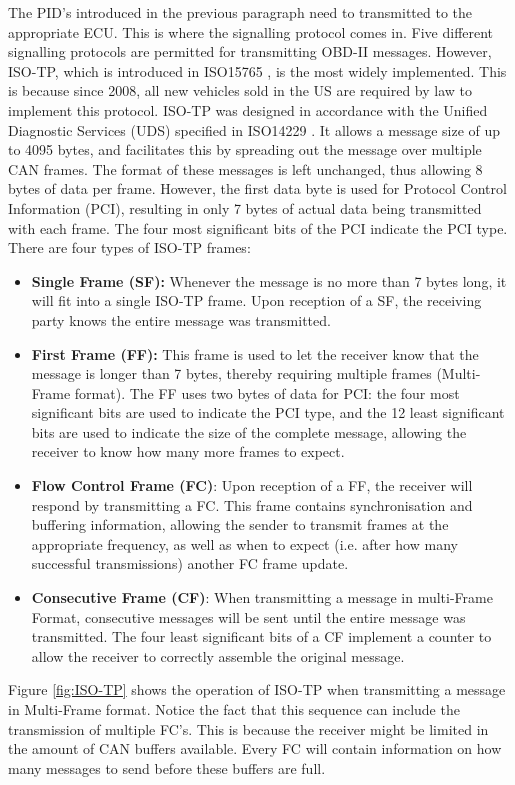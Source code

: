 The PID's introduced in the previous paragraph need to transmitted to the appropriate ECU. This is where the signalling protocol comes in. Five different signalling protocols are permitted for transmitting OBD-II messages. However, ISO-TP, which is introduced in ISO15765 \cite{ISO15765-2:2016}, is the most widely implemented. This is because since 2008, all new vehicles sold in the US are required by law to implement this protocol. ISO-TP was designed in accordance with the Unified Diagnostic Services (UDS) specified in ISO14229 \cite{ISO14229}. It allows a message size of up to 4095 bytes, and facilitates this by spreading out the message over multiple CAN frames. The format of these messages is left unchanged, thus allowing 8 bytes of data per frame. However, the first data byte is used for Protocol Control Information (PCI), resulting in only 7 bytes of actual data being transmitted with each frame. The four most significant bits of the PCI indicate the PCI type. There are four types of ISO-TP frames:
\begin{itemize}
	\item \textbf{Single Frame (SF):} Whenever the message is no more than 7 bytes long, it will fit into a single ISO-TP frame. Upon reception of a SF, the receiving party knows the entire message was transmitted.
	
	\item \textbf{First Frame (FF):} This frame is used to let the receiver know that the message is longer than 7 bytes, thereby requiring multiple frames (Multi-Frame format). The FF uses two bytes of data for PCI: the four most significant bits are used to indicate the PCI type, and the 12 least significant bits are used to indicate the size of the complete message, allowing the receiver to know how many more frames to expect.
	
	\item \textbf{Flow Control Frame (FC)}: Upon reception of a FF, the receiver will respond by transmitting a FC. This frame contains synchronisation and buffering information, allowing the sender to transmit frames at the appropriate frequency, as well as when to expect (i.e. after how many successful transmissions) another FC frame update.
	
	\item \textbf{Consecutive Frame (CF)}: When transmitting a message in multi-Frame Format, consecutive messages will be sent until the entire message was transmitted. The four least significant bits of a CF implement a counter to allow the receiver to correctly assemble the original message.
\end{itemize}
Figure \ref{fig:ISO-TP} shows the operation of ISO-TP when transmitting a message in Multi-Frame format. Notice the fact that this sequence can include the transmission of multiple FC's. This is because the receiver might be limited in the amount of CAN buffers available. Every FC will contain information on how many messages to send before these buffers are full.

